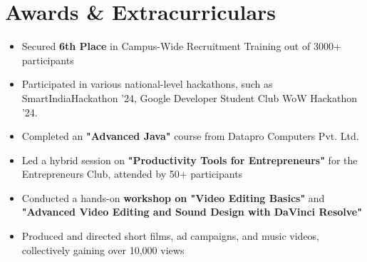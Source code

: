 \documentclass[10pt,letterpaper]{article}
\newenvironment{highlights}{
    \begin{itemize}[
        topsep=0.05cm,
        parsep=0.05cm,
        partopsep=0pt,
        itemsep=0pt,
        leftmargin=8pt
    ]
}{
    \end{itemize}
}
\newenvironment{onecolentry}{
    \begin{adjustwidth}{0cm + 0.00001cm}{0cm + 0.00001cm}
}{
    \end{adjustwidth}
}
\begin{document}
    \section{Awards \& Extracurriculars}
    \begin{highlights}
        \item Secured \textbf{6th Place} in Campus-Wide Recruitment Training out of 3000+ participants
        \item Participated in various national-level hackathons, such as SmartIndiaHackathon '24, Google Developer Student Club WoW Hackathon '24.
        \item Completed an \textbf{"Advanced Java"} course from Datapro Computers Pvt. Ltd.
        \item Led a hybrid session on \textbf{"Productivity Tools for Entrepreneurs"} for the Entrepreneurs Club, attended by 50+ participants
        \item Conducted a hands-on \textbf{workshop on "Video Editing Basics"} and \textbf{"Advanced Video Editing and Sound Design with DaVinci Resolve"}
        \item Produced and directed short films, ad campaigns, and music videos, collectively gaining over 10,000 views
    \end{highlights}

\end{document}
